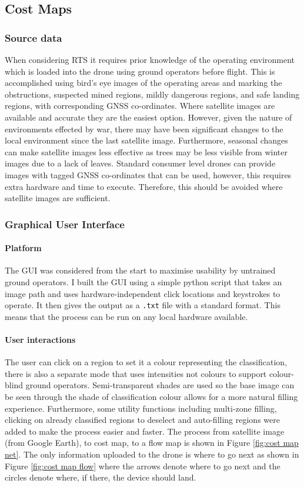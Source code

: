 \subsection{Cost Maps}\label{sub_section:tgt_cost_maps}
\subsubsection{Source data}\label{sub_sub_section:tgt_source_data}
When considering \gls{RTS} it requires prior knowledge of the operating environment which is loaded into the drone using ground operators before flight. This is accomplished using bird's eye images of the operating areas and marking the obstructions, suspected mined regions, mildly dangerous regions, and safe landing regions, with corresponding \gls{GNSS} co-ordinates.
Where satellite images are available and accurate they are the easiest option. However, given the nature of environments effected by war, there may have been significant changes to the local environment since the last satellite image. Furthermore, seasonal changes can make satellite images less effective as trees may be less visible from winter images due to a lack of leaves.
Standard consumer level drones can provide images with tagged \gls{GNSS} co-ordinates that can be used, however, this requires extra hardware and time to execute. Therefore, this should be avoided where satellite images are sufficient.

\subsubsection{Graphical User Interface}\label{sub_sub_section:tgt_GUI}
\paragraph{Platform} 
The \gls{GUI} was considered from the start to maximise usability by untrained ground operators. I built the \gls{GUI} using a simple python script that takes an image path and uses hardware-independent click locations and keystrokes to operate. It then gives the output as a \texttt{.txt} file with a standard format. This means that the process can be run on any local hardware available.
\paragraph{User interactions}
The user can click on a region to set it a colour representing the classification, there is also a separate mode that uses intensities not colours to support colour-blind ground operators. Semi-transparent shades are used so the base image can be seen through the shade of classification colour allows for a more natural filling experience. Furthermore, some utility functions including multi-zone filling, clicking on already classified regions to deselect and auto-filling regions were added to make the process easier and faster. The process from satellite image (from Google Earth), to cost map, to a flow map is shown in Figure \ref{fig:cost map net}. The only information uploaded to the drone is where to go next as shown in Figure \ref{fig:cost map flow} where the arrows denote where to go next and the circles denote where, if there, the device should land.

